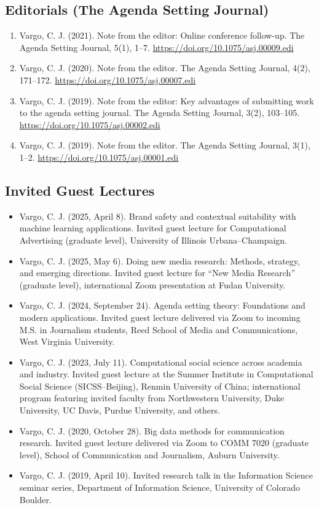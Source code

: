 \documentclass[11pt,letterpaper]{article}
\begin{document}
\subsection*{Editorials (The Agenda Setting Journal)}
{\small
\begin{enumerate}
\item Vargo, C. J. (2021). Note from the editor: Online conference follow-up. The Agenda Setting Journal, 5(1), 1--7. \url{https://doi.org/10.1075/asj.00009.edi}
\item Vargo, C. J. (2020). Note from the editor. The Agenda Setting Journal, 4(2), 171--172. \url{https://doi.org/10.1075/asj.00007.edi}
\item Vargo, C. J. (2019). Note from the editor: Key advantages of submitting work to the agenda setting journal. The Agenda Setting Journal, 3(2), 103--105. \url{https://doi.org/10.1075/asj.00002.edi}
\item Vargo, C. J. (2019). Note from the editor. The Agenda Setting Journal, 3(1), 1--2. \url{https://doi.org/10.1075/asj.00001.edi}
\end{enumerate}
}
\subsection*{Invited Guest Lectures}
{\small
\begin{itemize}
\item Vargo, C. J. (2025, April 8). Brand safety and contextual suitability with machine learning applications. Invited guest lecture for Computational Advertising (graduate level), University of Illinois Urbana--Champaign.
\item Vargo, C. J. (2025, May 6). Doing new media research: Methods, strategy, and emerging directions. Invited guest lecture for ``New Media Research'' (graduate level), international Zoom presentation at Fudan University.
\item Vargo, C. J. (2024, September 24). Agenda setting theory: Foundations and modern applications. Invited guest lecture delivered via Zoom to incoming M.S. in Journalism students, Reed School of Media and Communications, West Virginia University.
\item Vargo, C. J. (2023, July 11). Computational social science across academia and industry. Invited guest lecture at the Summer Institute in Computational Social Science (SICSS--Beijing), Renmin University of China; international program featuring invited faculty from Northwestern University, Duke University, UC Davis, Purdue University, and others.
\item Vargo, C. J. (2020, October 28). Big data methods for communication research. Invited guest lecture delivered via Zoom to COMM 7020 (graduate level), School of Communication and Journalism, Auburn University.
\item Vargo, C. J. (2019, April 10). Invited research talk in the Information Science seminar series, Department of Information Science, University of Colorado Boulder.
\end{itemize}
}
\end{document}
